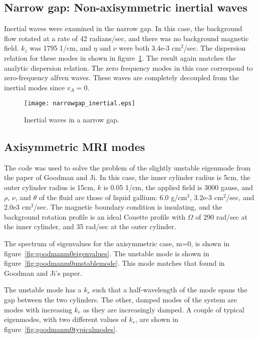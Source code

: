 \documentclass[letterpaper]{article}
\begin{document}
\subsection{Narrow gap: Non-axisymmetric inertial waves}
Inertial waves were examined in the narrow gap.  In this case, the
background flow rotated at a rate of 42 radians/sec, and there was no
background magnetic field.  $k_z$ was 1795 1/cm, and $\eta$ and $\nu$
were both 3.4e-3 cm$^2$/sec.  The dispersion relation for these modes
in shown in figure~\ref{fig:narrowgapinertial}.  The result again
matches the analytic dispersion relation.  The zero frequency modes in
this case correspond to zero-frequency alfven waves.  These waves are
completely decoupled from the inertial modes since $v_{A}=0$.

\begin{figure}
\begin{center}
\texttt{[image: narrowgap\_inertial.eps]}
\caption{Inertial waves in a narrow gap.}
\label{fig:narrowgapinertial}
\end{center}
\end{figure}

\subsection{Axisymmetric MRI modes}

The code was used to solve the problem of the slightly unstable
eigenmode from the paper of Goodman and Ji.  In this case, the inner
cylinder radius is 5cm, the outer cylinder radius is 15cm, $k$ is 0.05
1/cm, the applied field is 3000 gauss, and $\rho$, $\nu$, and $\theta$
of the fluid are those of liquid gallium: 6.0 g/cm$^3$, 3.2e-3
cm$^2$/sec, and 2.0e3 cm$^2$/sec.  The magnetic boundary condition is
insulating, and the background rotation profile is an ideal Couette
profile with $\Omega$ of 290 rad/sec at the inner cylinder, and 35
rad/sec at the outer cylinder.

The spectrum of eigenvalues for the axisymmetric case, m=0, is shown
in figure~\ref{fig:goodmanm0eigenvalues}.  The unstable mode is shown
in figure~\ref{fig:goodmanm0unstablemode}.  This mode matches that
found in Goodman and Ji's paper.

The unstable mode has a $k_r$ such that a half-wavelength of the mode
spans the gap between the two cylinders.  The other, damped modes of
the system are modes with increasing $k_r$ as they are increasingly
damped.  A couple of typical eigenmodes, with two different values of
$k_r$, are shown in figure~\ref{fig:goodmanm0typicalmodes}.
\end{document}
